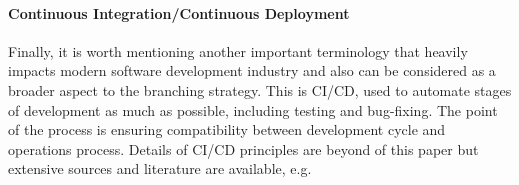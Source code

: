 \paragraph{Continuous Integration/Continuous Deployment}
Finally, it is worth mentioning another important terminology that heavily impacts modern software development industry
and also can be considered as a broader aspect to the branching strategy. This is CI/CD, used to automate stages of 
development as much as possible, including testing and bug-fixing. The point of the process is ensuring compatibility 
between development cycle and operations process. Details of CI/CD principles are beyond of this paper but extensive
sources and literature are available, e.g. \cite{ci-cid-pipeline}